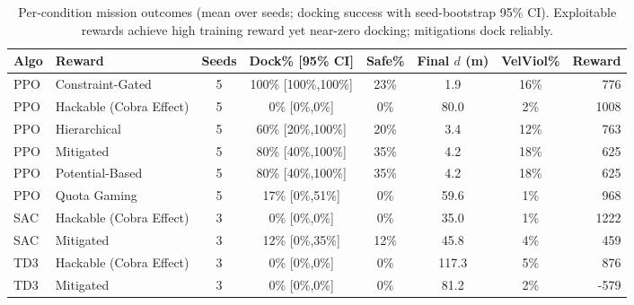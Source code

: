 \begin{table}[t]
\centering
\small
\caption{Per-condition mission outcomes (mean over seeds; docking success with seed-bootstrap 95\% CI). Exploitable rewards achieve high training reward yet near-zero docking; mitigations dock reliably.}
\label{tab:main}
\begin{tabular}{llccccc r}
\toprule
Algo & Reward & Seeds & Dock\% [95\% CI] & Safe\% & Final $d$ (m) & VelViol\% & Reward \\
\midrule
PPO & Constraint-Gated & 5 & 100\% [100\%,100\%] & 23\% & 1.9 & 16\% & 776 \\
PPO & Hackable (Cobra Effect) & 5 & 0\% [0\%,0\%] & 0\% & 80.0 & 2\% & 1008 \\
PPO & Hierarchical & 5 & 60\% [20\%,100\%] & 20\% & 3.4 & 12\% & 763 \\
PPO & Mitigated & 5 & 80\% [40\%,100\%] & 35\% & 4.2 & 18\% & 625 \\
PPO & Potential-Based & 5 & 80\% [40\%,100\%] & 35\% & 4.2 & 18\% & 625 \\
PPO & Quota Gaming & 5 & 17\% [0\%,51\%] & 0\% & 59.6 & 1\% & 968 \\
SAC & Hackable (Cobra Effect) & 3 & 0\% [0\%,0\%] & 0\% & 35.0 & 1\% & 1222 \\
SAC & Mitigated & 3 & 12\% [0\%,35\%] & 12\% & 45.8 & 4\% & 459 \\
TD3 & Hackable (Cobra Effect) & 3 & 0\% [0\%,0\%] & 0\% & 117.3 & 5\% & 876 \\
TD3 & Mitigated & 3 & 0\% [0\%,0\%] & 0\% & 81.2 & 2\% & -579 \\
\bottomrule
\end{tabular}
\end{table}
